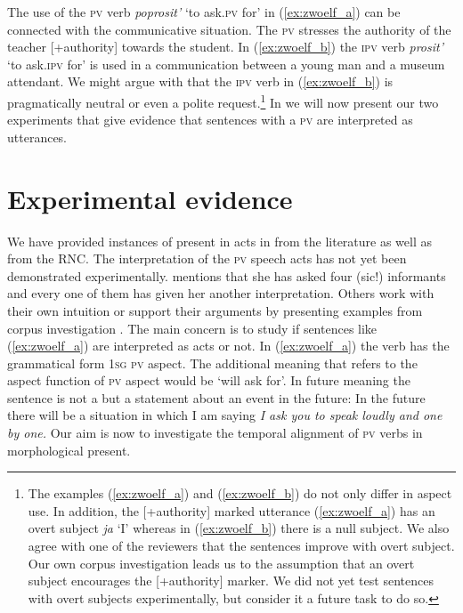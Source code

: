 \documentclass[output=paper,colorlinks,citecolor=brown,newtxmath,hidelinks]{langscibook}
\begin{document}
\noindent The use of the \textsc{pv} verb \textit{poprosit’} ‘to ask\textsc{.pv} for’ in (\ref{ex:zwoelf_a}) can be connected with the communicative situation. The \textsc{pv}  stresses the authority of the teacher [+authority] towards the student. In (\ref{ex:zwoelf_b}) the \textsc{ipv} verb \textit{prosit’} ‘to ask\textsc{.ipv} for’ is used in a communication between a young man and a museum attendant. We might argue with \citeauthor{Israeli2001} that the \textsc{ipv} verb in (\ref{ex:zwoelf_b}) is pragmatically neutral or even a polite request.\footnote{The examples (\ref{ex:zwoelf_a}) and (\ref{ex:zwoelf_b}) do not only differ in aspect use. In addition, the [+authority] marked utterance (\ref{ex:zwoelf_a}) has an overt subject \textit{ja} ‘I’ whereas in (\ref{ex:zwoelf_b}) there is a null subject. We also agree with one of the reviewers that the sentences improve with overt subject. Our own corpus investigation leads us to the assumption that an overt subject encourages the [+authority] marker. We did not yet test sentences with overt subjects experimentally, but consider it a future task to do so.\label{fn5}} In  we will now present our two experiments that give evidence that sentences with a \textsc{pv}  are interpreted as  utterances. 

\section{Experimental evidence}\label{sct:zwei}

We have provided instances of present  in  acts in  from the literature as well as from the RNC. The interpretation of the \textsc{pv} speech acts has not yet been demonstrated experimentally. \citet{Rathmayr1976} mentions that she has asked four (sic!) informants and every one of them has given her another interpretation. Others work with their own intuition or support their arguments by presenting examples from corpus investigation \citep{Wiemer2014,Laczinski2014}. The main concern is to study if sentences like (\ref{ex:zwoelf_a}) are interpreted as  acts or not. In (\ref{ex:zwoelf_a}) the verb has the grammatical form \textsc{1sg pv} aspect. The additional meaning that refers to the aspect function of \textsc{pv} aspect would be ‘will ask for’. In future meaning the sentence is not a  but a statement about an event in the future: In the future there will be a situation in which I am saying \textit{I ask you to speak loudly and one by one.} Our aim is now to investigate the temporal alignment of \textsc{pv}  verbs in morphological present.
\end{document}
